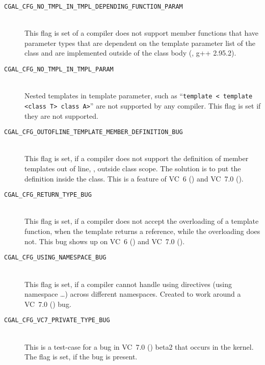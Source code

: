 \begin{description}
\item[{\tt CGAL\_CFG\_NO\_TMPL\_IN\_TMPL\_DEPENDING\_FUNCTION\_PARAM}]~\\
  This flag is set of a compiler does not support member functions
  that have parameter types that are dependent on the template
  parameter list of the class and are implemented outside of the class
  body (\eg, g++ 2.95.2).
  
\item[{\tt CGAL\_CFG\_NO\_TMPL\_IN\_TMPL\_PARAM}]~\\
  Nested templates in template parameter, such as ``\texttt{template <
    template <class T> class A>}'' are not supported by any compiler.
  This flag is set if they are not supported.

\item[{\tt CGAL\_CFG\_OUTOFLINE\_TEMPLATE\_MEMBER\_DEFINITION\_BUG}]~\\
  This flag is set, if a compiler does not support the definition of
  member templates out of line, \ie, outside class scope. The solution
  is to put the definition inside the class. This is a feature of VC~6
  () and VC~7.0 ().

\item[{\tt CGAL\_CFG\_RETURN\_TYPE\_BUG}]~\\
  This flag is set, if a compiler does not accept the overloading of a
  template function, when the template returns a reference, while the
  overloading does not. This bug shows up on VC~6 () and
  VC~7.0 ().

\item[{\tt CGAL\_CFG\_USING\_NAMESPACE\_BUG}]~\\
  This flag is set, if a compiler cannot handle using directives
  (using namespace \ldots) across different namespaces. Created to
  work around a VC~7.0 () bug.

\item[{\tt CGAL\_CFG\_VC7\_PRIVATE\_TYPE\_BUG}]~\\
  This is a test-case for a bug in VC~7.0 () beta2 that
  occurs in the kernel. The flag is set, if the bug is present.

\end{description}

